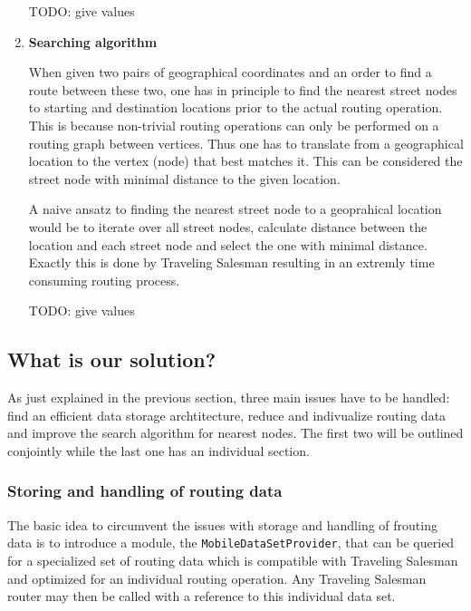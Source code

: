\begin{enumerate}
		TODO: give values
											
	\item \textbf{Searching algorithm}
	
		When given two pairs of geographical coordinates and an order to find a route between these two, one has in principle to find the nearest street nodes to starting and destination locations prior to the actual routing operation. This is because non-trivial routing operations can only be performed on a routing graph between vertices. Thus one has to translate from a geographical location to the vertex (node) that best matches it. This can be considered the street node with minimal distance to the given location.\newline
				
		A naive ansatz to finding the nearest street node 	to a geoprahical location would be to iterate over all street nodes, calculate distance between the location and each street node and select the one with minimal distance. Exactly this is done by Traveling Salesman resulting in an extremly time consuming routing process.\newline
		
		TODO: give values

\end{enumerate}


\subsection{What is our solution?}

As just explained in the previous section, three main issues have to be handled: find an efficient data storage archtitecture, reduce and indivualize routing data and improve the search algorithm for nearest nodes. The first two will be outlined conjointly while the last one has an individual section.

\subsubsection{Storing and handling of routing data}

The basic idea to circumvent the issues with storage and handling of frouting data is to introduce a module, the \texttt{MobileDataSetProvider}, that can be queried for a specialized set of routing data which is compatible with Traveling Salesman and optimized for an individual routing operation. Any Traveling Salesman router may then be called with a reference to this individual data set.\newline

